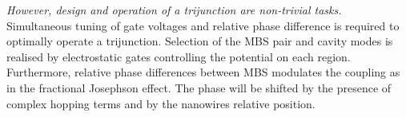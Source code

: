\textit{However, design and operation of a trijunction are non-trivial tasks.}
Simultaneous tuning of gate voltages and relative phase difference is required to optimally operate a trijunction.
Selection of the MBS pair and cavity modes is realised by electrostatic gates controlling the potential on each region.
Furthermore, relative phase differences between MBS modulates the coupling as in the fractional Josephson effect.
The phase will be shifted by the presence of complex hopping terms and by the nanowires relative position.







